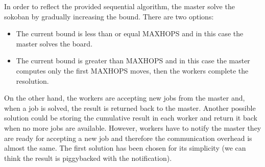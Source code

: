 \documentclass{article}
\begin{document}
In order to reflect the provided sequential algorithm, the master solve the sokoban by gradually increasing the bound. There are two options:
\begin{itemize}
    \item The current bound is less than or equal MAXHOPS and in this case the master solves the board.
    \item The current bound is greater than MAXHOPS and in this case the master computes only the first MAXHOPS moves, then the workers complete the resolution.
\end{itemize}
On the other hand, the workers are accepting new jobs from the master and, when a job is solved, the result is returned back to the master. Another possible solution could be storing the cumulative result in each worker and return it back when no more jobs are available. However, workers have to notify the master they are ready for accepting a new job and therefore the communication overhead is almost the same. The first solution has been chosen for its simplicity (we can think the result is piggybacked with the notification). \\
\end{document}
